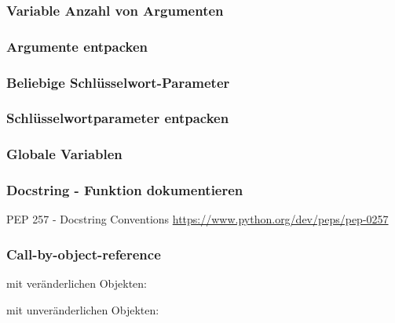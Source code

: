 \subsubsection{Variable Anzahl von Argumenten}


\subsubsection{Argumente entpacken}


\subsubsection{Beliebige Schlüsselwort-Parameter}


\subsubsection{Schlüsselwortparameter entpacken}


\subsubsection{Globale Variablen}


\subsubsection{Docstring - Funktion dokumentieren}
PEP 257 - Docstring Conventions \url{https://www.python.org/dev/peps/pep-0257}


\subsubsection{Call-by-object-reference}
mit veränderlichen Objekten:

mit unveränderlichen Objekten:

